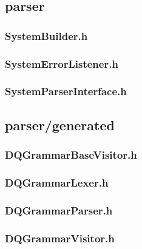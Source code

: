 \subsection*{parser}

\subsubsection*{SystemBuilder.h}


\subsubsection*{SystemErrorListener.h}


\subsubsection*{SystemParserInterface.h}


\subsection*{parser/generated}

\subsubsection*{DQGrammarBaseVisitor.h}


\subsubsection*{DQGrammarLexer.h}


\subsubsection*{DQGrammarParser.h}


\subsubsection*{DQGrammarVisitor.h}


